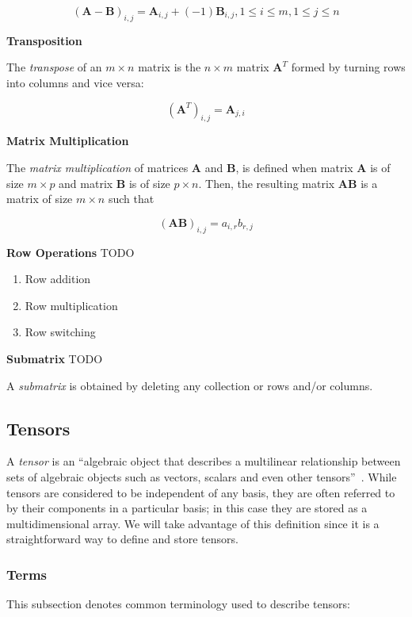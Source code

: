 \documentclass[12pt]{article}
\begin{document}
$$(\mathbf A - \mathbf B)_{i,j} = \mathbf{A}_{i,j} + (-1)\mathbf{B}_{i,j}, 1 \leq i \leq m, 1 \leq j \leq n$$


\medskip
\noindent\textbf{Transposition}

\noindent The \textit{transpose} of an $m\times n$ matrix is the $n\times m$ matrix $\mathbf{A}^T$
formed by turning rows into columns and vice versa:

$$(\mathbf A^T)_{i,j} = \mathbf A_{j,i}$$

\medskip
\noindent\textbf{Matrix Multiplication}

\noindent The \textit{matrix multiplication} of matrices $\mathbf A$ and $\mathbf B$, is 
defined when matrix $\mathbf A$ is of size $m \times p$ and matrix $\mathbf B$ is of 
size $p \times n$. Then, the resulting matrix $\mathbf A\mathbf B$ is a matrix of size 
$m \times n$ such that

$$(\mathbf A\mathbf B)_{i,j} = a_{i,r}b_{r,j}$$


\medskip
\noindent\textbf{Row Operations}
TODO

\begin{enumerate}
\item Row addition
\item Row multiplication
\item Row switching
\end{enumerate}


\medskip
\noindent\textbf{Submatrix}
TODO 

\noindent A \textit{submatrix} is obtained by deleting any collection or rows and/or columns.


\subsection{Tensors}
A \textit{tensor} is an ``algebraic object that describes a multilinear
relationship between sets of algebraic objects such as vectors, scalars
and even other tensors''~\citep{Wikipedia_Tensors_2025}. While tensors
are considered to be independent of any basis, they are often referred
to by their components in a particular basis; in this case they are
stored as a multidimensional array. We will take advantage of this 
definition since it is a straightforward way to define and store tensors.

\subsubsection{Terms}
This subsection denotes common terminology used to describe tensors:
\end{document}
